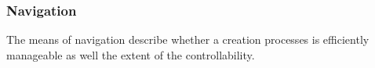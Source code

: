 


\subsubsection{Navigation}
\label{subsubsec:navigation}

The means of navigation describe whether a creation processes is efficiently manageable as well the extent of the controllability.

